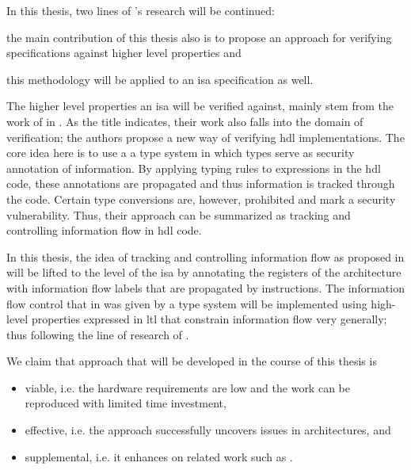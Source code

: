 In this thesis, two lines of \citeauthor{Reid17}'s research will be continued: \begin{enumerate*}[label=\alph*)]
    \item the main contribution of this thesis also is to propose an approach for verifying specifications against higher level properties and
    \item this methodology will be applied to an \gls{isa} specification as well.
\end{enumerate*}

The higher level properties an \gls{isa} will be verified against, mainly stem from the work of \citeauthor{Ferraiuolo17} in  \cite{Ferraiuolo17}.
As the title indicates, their work also falls into the domain of verification; the authors propose a new way of verifying \gls{hdl} implementations.
The core idea here is to use a a type system in which types serve as security annotation of information.
By applying typing rules to expressions in the \gls{hdl} code, these annotations are propagated and thus information is tracked through the code.
Certain type conversions are, however, prohibited and mark a security vulnerability.
Thus, their approach can be summarized as tracking and controlling information flow in \gls{hdl} code.

In this thesis, the idea of tracking and controlling information flow as proposed in \cite{Ferraiuolo17} will be lifted to the level of the \gls{isa} by annotating the registers of the architecture with information flow labels that are propagated by instructions.
The information flow control that in \cite{Ferraiuolo17} was given by a type system will be implemented using high-level properties expressed in \gls{ltl} that constrain information flow very generally; thus following the line of research of \cite{Reid17}.

We claim that approach that will be developed in the course of this thesis is
\begin{itemize}
    \item viable, i.e. the hardware requirements are low and the work can be reproduced with limited time investment,
    \item effective, i.e. the approach successfully uncovers issues in architectures, and
    \item supplemental, i.e. it enhances on related work such as \cite{Reid17}.
\end{itemize}

